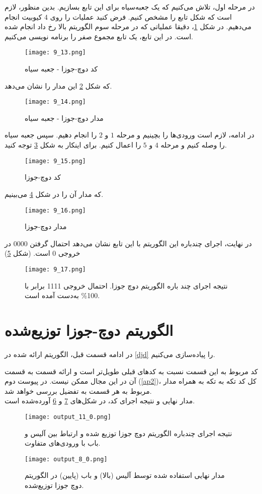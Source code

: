 در مرحله اول، تلاش می‌کنیم که یک جعبه‌سیاه برای این تابع بسازیم. بدین منظور، لازم است که شکل تابع را مشخص کنیم. فرض کنید عملیات را روی $4$ کیوبیت انجام می‌دهیم. در شکل  \ref{fig:9-13}، دقیقا عملیاتی که در مرحله سوم الگوریتم بالا رخ داد انجام شده است. در این تابع، یک تابع مجموع صفر را برنامه نویسی می‌کنیم.
\begin{figure}[h]
	\caption{کد دوچ-جوزا - جعبه سیاه}
	\centering
	\texttt{[image: 9\_13.png]}
	\label{fig:9-13}
\end{figure}  
که شکل \ref{fig:9-14} این مدار را نشان می‌دهد. 
\begin{figure}[h]
	\caption{مدار دوچ-جوزا - جعبه سیاه}
	\centering
	\texttt{[image: 9\_14.png]}
	\label{fig:9-14}
\end{figure}
در ادامه، لازم است ورودی‌ها را بچینیم و مرحله $1$ و $2$ را انجام دهیم. سپس جعبه سیاه را وصله کنیم و مرحله $4$ و $5$ را اعمال کنیم. برای اینکار به شکل \ref{fig:9-15} توجه کنید. 
 
\begin{figure}[h]
	\caption{کد دوچ-جوزا }
	\centering
	\texttt{[image: 9\_15.png]}
	\label{fig:9-15}
\end{figure}
که مدار آن را در شکل \ref{fig:9-16} می‌بینیم. 
\begin{figure}[h]
	\caption{مدار دوچ-جوزا }
	\centering
	\texttt{[image: 9\_16.png]}
	\label{fig:9-16}
\end{figure}
در نهایت، اجرای چندباره این الگوریتم با این تابع نشان ‌می‌دهد احتمال گرفتن $0000$ در خروجی $0$ است. (شکل \ref{fig:9-17})
\begin{figure}[h]
	\centering
	\texttt{[image: 9\_17.png]}
	\caption{نتیجه اجرای چند باره الگوریتم دوچ جوزا. احتمال خروجی 1111 برابر با 100\% به‌دست آمده است.}
	\label{fig:9-17}
\end{figure}
\pagebreak
\section{الگوریتم دوچ-جوزا توزیع‌شده}

در ادامه قسمت قبل، الگوریتم ارائه شده در \autoref{djd} را پیاده‌سازی می‌کنیم.

کد مربوط به این قسمت نسبت به کدهای قبلی‌ طویل‌تر است و ارائه قسمت به قسمت آن در این مجال ممکن نیست. در پیوست دوم (\autoref{ap2})، کل کد تکه به تکه به همراه مدار مربوط به هر قسمت به تفضیل بررسی خواهد شد.\\
 مدار نهایی و نتیجه اجرای کد، در شکل‌های \ref{fig:sim1} و \ref{fig:sim2} آورده‌شده است.
  \begin{figure}
  \centering
 
 \texttt{[image: output\_11\_0.png]}
 \caption{نتیجه اجرای چندباره الگوریتم دوچ جوزا توزیع شده و ارتباط بین آلیس و باب با ورودی‌های متفاوت.}
 \label{fig:sim2}
 \end{figure}
 \begin{figure}
 \centering
 
 \texttt{[image: output\_8\_0.png]}
 \caption{مدار نهایی استفاده شده توسط آلیس (بالا) و باب (پایین) در الگوریتم‌ دوچ جوزا توزیع‌شده.}
 \label{fig:sim1}
 \end{figure}
 
